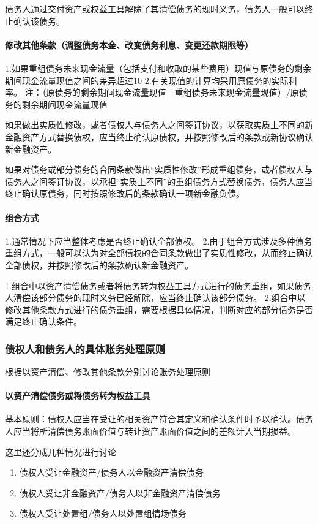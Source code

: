 \documentclass[UTF8,12pt]{ctexart}
\numberwithin{equation}{section} %
\numberwithin{figure}{section}
\numberwithin{table}{section}
\begin{document}
	债务人通过交付资产或权益工具解除了其清偿债务的现时义务，债务人一般可以终止确认该债务。
	
	\paragraph{修改其他条款（调整债务本金、改变债务利息、变更还款期限等）}
	1.如果重组债务未来现金流量（包括支付和收取的某些费用）现值与原债务的剩余期间现金流量现值之间的差异超过10%
	2.有关现值的计算均采用原债务的实际利率。
	注：（原债务的剩余期间现金流量现值－重组债务未来现金流量现值）/原债务的剩余期间现金流量现值
	
	如果做出实质性修改，或者债权人与债务人之间签订协议，以获取实质上不同的新金融资产方式替换债权，应当终止确认原债权，并按照修改后的条款或新协议确认新金融资产。
	
	如果对债务或部分债务的合同条款做出“实质性修改”形成重组债务，或者债权人与债务人之间签订协议，以承担“实质上不同”的重组债务方式替换债务，债务人应当终止确认原债务，同时按照修改后的条款确认一项新金融负债。
	
	\paragraph{组合方式}
	1.通常情况下应当整体考虑是否终止确认全部债权。
	2.由于组合方式涉及多种债务重组方式，一般可以认为对全部债权的合同条款做出了实质性修改，从而终止确认全部债权，并按照修改后的条款确认新金融资产。
	
	1.组合中以资产清偿债务或者将债务转为权益工具方式进行的债务重组，如果债务人清偿该部分债务的现时义务已经解除，应当终止确认该部分债务。
	2.组合中以修改其他条款方式进行的债务重组，需要根据具体情况，判断对应的部分债务是否满足终止确认条件。
	
	
	
	\subsubsection{债权人和债务人的具体账务处理原则}
	根据以资产清偿、修改其他条款分别讨论账务处理原则
	\paragraph{以资产清偿债务或将债务转为权益工具}基本原则：债权人应当在受让的相关资产符合其定义和确认条件时予以确认。债务人应当将所清偿债务账面价值与转让资产账面价值之间的差额计入当期损益。
	
	这里还分成几种情况进行讨论
	\begin{enumerate}
		\item 债权人受让金融资产/债务人以金融资产清偿债务
		
		\item 债权人受让非金融资产/债务人以非金融资产清偿债务
		
		\item 债权人受让处置组/债务人以处置组情场债务
	\end{enumerate}
	
\end{document}
